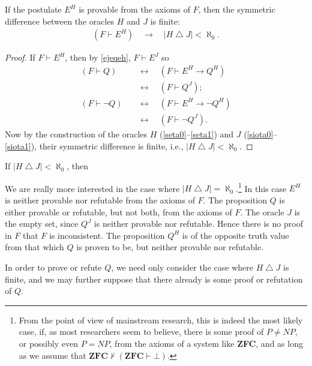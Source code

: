 \documentclass[letterpaper]{article}
\newcommand{\Corollary}{\CircPipe}
\begin{document}
\begin{theorem}\label{theoremx}
If the postulate $E^H$ is provable from the axioms of $F$, then the symmetric difference between the oracles $H$ and $J$ is finite:
\begin{align}
(F\vdash E^H)\quad\longrightarrow\quad\left|H\operatorname\triangle J\right|<\aleph_0.
\end{align}
\end{theorem}
\begin{proof}
If $F\vdash E^H$, then by \Corollary \ref{ejeqeh}, $F\vdash E^J$ so
\begin{align}
(F\vdash Q)\quad
&\longleftrightarrow\quad(F\vdash E^H\longrightarrow Q^H) \\
&\longleftrightarrow\quad(F\vdash Q^J); \\
(F\vdash\lnot Q)\quad
&\longleftrightarrow\quad(F\vdash E^H\longrightarrow\lnot Q^H) \\
&\longleftrightarrow\quad(F\vdash\lnot Q^J).
\end{align}	
Now by the construction of the oracles $H$ (\ref{seta0}--\ref{seta1}) and $J$ (\ref{siota0}--\ref{siota1}), their symmetric difference is finite, i.e., $\left|H\operatorname\triangle J\right|<\aleph_0$.
\end{proof}
\begin{theorem}
If $\left|H\operatorname\triangle J\right|<\aleph_0$, then 
\end{theorem}

\begin{remark}
We are really more interested in the case where $|H\operatorname{\triangle}J|=\aleph_0$.\footnote{From the point of view of mainstream research, this is indeed the most likely case, if, as most researchers seem to believe, there is some proof of $P\ne NP$, or possibly even $P=NP$, from the axioms of a system like \textbf{ZFC}, and as long as we assume that $\textbf{ZFC}\nvdash(\textbf{ZFC}\vdash\bot)$.}  In this case $E^H$ is neither provable nor refutable from the axioms of $F$.  The proposition $Q$ is either provable or refutable, but not both, from the axioms of $F$.  The oracle $J$ is the empty set, since $Q^J$ is neither provable nor refutable.  Hence there is no proof in $F$ that $F$ is inconsistent.  The proposition $Q^H$ is of the opposite truth value from that which $Q$ is proven to be, but neither provable nor refutable.
\end{remark}
In order to prove or refute $Q$, we need only consider the case where $H\operatorname{\triangle}J$ is finite, and we may further suppose that there already is some proof or refutation of $Q$.
\end{document}

